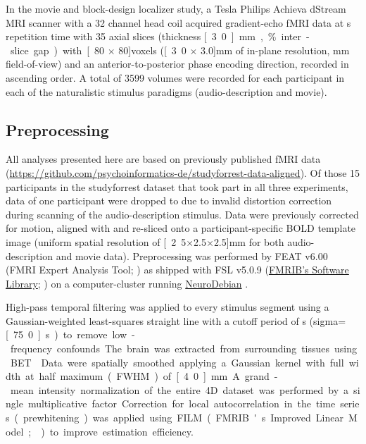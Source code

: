 \documentclass[english]{article}
\begin{document}
In the movie and block-design localizer study, a \unit[3]{Tesla} Philips Achieva dStream
MRI scanner with a 32 channel head coil acquired gradient-echo fMRI data
at \unit[2]{s} repetition time with
35 axial slices (thickness \unit[3.0]{mm}, \unit[10]{\%} inter-slice gap) with
\unit[80 $\times$ 80]{voxels} (\unit[3.0 $\times$ 3.0]{mm} of in-plane
resolution, \unit[240]{mm} field-of-view) and an anterior-to-posterior phase
encoding direction, recorded in ascending order.
A total of 3599 volumes were recorded for each participant in each of the
naturalistic stimulus paradigms (audio-description and movie).

\subsection{Preprocessing}

All analyses presented here are based on previously published fMRI data
(\url{https://github.com/psychoinformatics-de/studyforrest-data-aligned}).
Of those 15 participants in the studyforrest dataset that took
part in all three experiments,
data of one participant were dropped to due to invalid distortion correction
during scanning of the audio-description stimulus.
Data were previously corrected for motion, aligned with and re-sliced onto a
participant-specific BOLD template image \citep{sengupta2016extension}
(uniform spatial resolution of \unit[2.5$\times$2.5$\times$2.5]{mm} for both
audio-description and movie data).
Preprocessing was performed by FEAT v6.00 (FMRI Expert Analysis Tool;
\citep{woolrich2001autocorr}) as shipped with
FSL v5.0.9 (\href{https://www.fmrib.ox.ac.uk/fsl}{FMRIB's Software Library};
\citep{smith2004fsl}) on a computer-cluster running
\href{http://neuro.debian.net}{NeuroDebian} \citep{halchenko2012open}.

High-pass temporal filtering was applied to every stimulus segment using a
Gaussian-weighted least-squares straight line with a cutoff period of
\unit[150]{s} (sigma=\unit[75.0]{s}) to remove low-frequency confounds.
The brain was extracted from surrounding tissues using BET \citep{smith2002bet}.
Data were spatially smoothed applying a Gaussian kernel with full width at half
maximum (FWHM) of \unit[4.0]{mm}.
A grand-mean intensity normalization of the entire 4D dataset was performed by a
single multiplicative factor.
Correction for local autocorrelation in the time series (prewhitening) was
applied using FILM (FMRIB's Improved Linear Model; \citep{woolrich2001autocorr})
to improve estimation efficiency.
\end{document}
